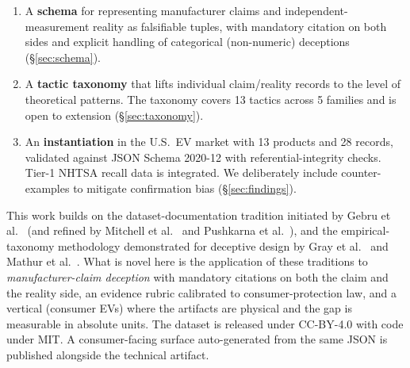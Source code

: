 \documentclass{article}
\begin{document}
\begin{enumerate}
  \item A \textbf{schema} for representing manufacturer claims and independent-measurement reality as falsifiable tuples, with mandatory citation on both sides and explicit handling of categorical (non-numeric) deceptions (\S\ref{sec:schema}).
  \item A \textbf{tactic taxonomy} that lifts individual claim/reality records to the level of theoretical patterns. The taxonomy covers 13 tactics across 5 families and is open to extension (\S\ref{sec:taxonomy}).
  \item An \textbf{instantiation} in the U.S.\ EV market with 13 products and 28 records, validated against JSON Schema 2020-12 with referential-integrity checks. Tier-1 NHTSA recall data is integrated. We deliberately include counter-examples to mitigate confirmation bias (\S\ref{sec:findings}).
\end{enumerate}

This work builds on the dataset-documentation tradition initiated by Gebru et al.~\cite{gebru_datasheets_2021} (and refined by Mitchell et al.~\cite{mitchell_modelcards_2019} and Pushkarna et al.~\cite{pushkarna_datacards_2022}), and the empirical-taxonomy methodology demonstrated for deceptive design by Gray et al.~\cite{gray_darkpatterns_2018} and Mathur et al.~\cite{mathur_darkpatterns_2019,mathur_darkdark_2021}. What is novel here is the application of these traditions to \emph{manufacturer-claim deception} with mandatory citations on both the claim and the reality side, an evidence rubric calibrated to consumer-protection law, and a vertical (consumer EVs) where the artifacts are physical and the gap is measurable in absolute units. The dataset is released under CC-BY-4.0 with code under MIT. A consumer-facing surface auto-generated from the same JSON is published alongside the technical artifact.
\end{document}
